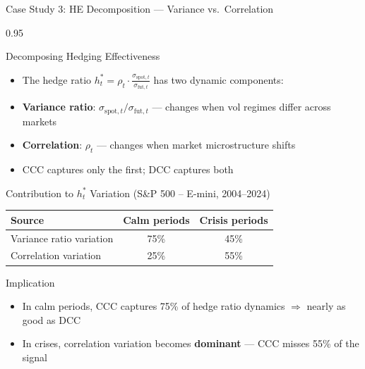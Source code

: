 \documentclass[9pt, aspectratio=169, t]{beamer}
\begin{document}
\begin{frame}{Case Study 3: HE Decomposition --- Variance vs.\ Correlation}
    \begin{cminipage}{0.95\textwidth}
    {\footnotesize
    \begin{block}{Decomposing Hedging Effectiveness}
        \begin{itemize}\setlength{\itemsep}{0pt}
            \item The hedge ratio $h_t^* = \rho_t \cdot \frac{\sigma_{\text{spot},t}}{\sigma_{\text{fut},t}}$ has two dynamic components:
            \item \textbf{Variance ratio}: $\sigma_{\text{spot},t} / \sigma_{\text{fut},t}$ --- changes when vol regimes differ across markets
            \item \textbf{Correlation}: $\rho_t$ --- changes when market microstructure shifts
            \item CCC captures only the first; DCC captures both
        \end{itemize}
    \end{block}
    \vspace{-2mm}
    \begin{block}{Contribution to $h_t^*$ Variation (S\&P 500 -- E-mini, 2004--2024)}
        {\small
        \begin{center}
        \begin{tabular}{l|cc}
            \hline
            \textbf{Source} & \textbf{Calm periods} & \textbf{Crisis periods} \\
            \hline
            Variance ratio variation & 75\% & 45\% \\
            Correlation variation    & 25\% & 55\% \\
            \hline
        \end{tabular}
        \end{center}
        }
    \end{block}
    \vspace{-2mm}
    \begin{alertblock}{Implication}
        \begin{itemize}\setlength{\itemsep}{0pt}
            \item In calm periods, CCC captures 75\% of hedge ratio dynamics $\Rightarrow$ nearly as good as DCC
            \item In crises, correlation variation becomes \textbf{dominant} --- CCC misses 55\% of the signal
        \end{itemize}
    \end{alertblock}
    }
    \end{cminipage}
\end{frame}
\end{document}
